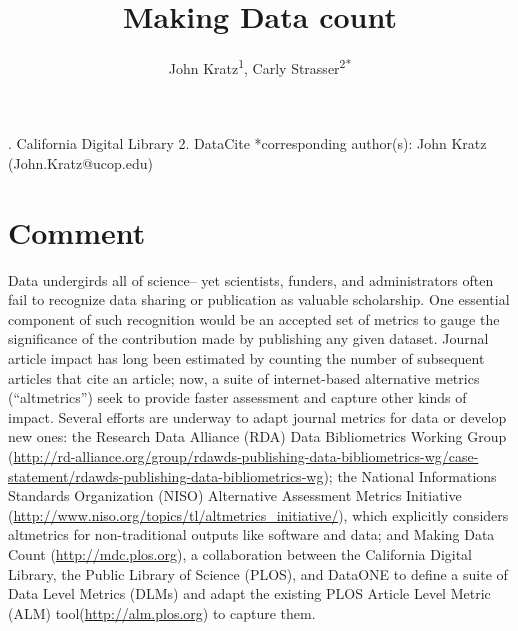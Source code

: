 \documentclass[english]{article}
\begin{document}
\title{Making Data count}


\author{John Kratz\textsuperscript{1}, Carly Strasser\textsuperscript{2{*}}}

. California Digital Library 2. DataCite 
{*}corresponding author(s): John Kratz (John.Kratz@ucop.edu)


\section*{Comment}


Data undergirds all of science-- yet scientists, funders, and administrators often fail to recognize data sharing or publication as valuable scholarship.
One essential component of such recognition would be an accepted set of metrics to gauge the significance of the contribution made by publishing any given dataset.
Journal article impact has long been estimated by counting the number of subsequent articles that cite an article; now, a suite of internet-based alternative metrics (``altmetrics'') seek to provide faster assessment and capture other kinds of impact.
Several efforts are underway to adapt journal metrics for data or develop new ones: the Research Data Alliance (RDA) Data Bibliometrics Working Group (\url{http://rd-alliance.org/group/rdawds-publishing-data-bibliometrics-wg/case-statement/rdawds-publishing-data-bibliometrics-wg}{}); the National Informations Standards Organization (NISO) Alternative Assessment Metrics Initiative (\url{http://www.niso.org/topics/tl/altmetrics_initiative/}), which explicitly considers altmetrics for non-traditional outputs like software and data; and Making Data Count (\url{http://mdc.plos.org}), a collaboration between the California Digital Library, the Public Library of Science (PLOS), and DataONE to define a suite of Data Level Metrics (DLMs) and adapt the existing PLOS Article Level Metric (ALM) tool(\url{http://alm.plos.org}) to capture them.

\end{document}
